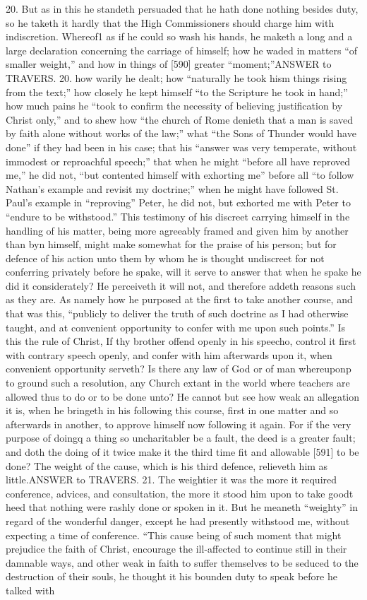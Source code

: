 20. But as in this he standeth persuaded that he hath done nothing besides duty, so he taketh it hardly that the High Commissioners should charge him with indiscretion. Whereof1 as if he could so wash his hands, he maketh a long and a large declaration concerning the carriage of himself; how he waded in matters “of smaller weight,” and how in things of [590] greater “moment;”ANSWER to TRAVERS. 20. how warily he dealt; how “naturally he took hism things rising from the text;” how closely he kept himself “to the Scripture he took in hand;” how much pains he “took to confirm the necessity of believing justification by Christ only,” and to shew how “the church of Rome denieth that a man is saved by faith alone without works of the law;” what “the Sons of Thunder would have done” if they had been in his case; that his “answer was very temperate, without immodest or reproachful speech;” that when he might “before all have reproved me,” he did not, “but contented himself with exhorting me” before all “to follow Nathan’s example and revisit my doctrine;” when he might have followed St. Paul’s example in “reproving” Peter, he did not, but exhorted me with Peter to “endure to be withstood.” This testimony of his discreet carrying himself in the handling of his matter, being more agreeably framed and given him by another than byn himself, might make somewhat for the praise of his person; but for defence of his action unto them by whom he is thought undiscreet for not conferring privately before he spake, will it serve to answer that when he spake he did it considerately? He perceiveth it will not, and therefore addeth reasons such as they are. As namely how he purposed at the first to take another course, and that was this, “publicly to deliver the truth of such doctrine as I had otherwise taught, and at convenient opportunity to confer with me upon such points.” Is this the rule of Christ, If thy brother offend openly in his speecho, control it first with contrary speech openly, and confer with him afterwards upon it, when convenient opportunity serveth? Is there any law of God or of man whereuponp to ground such a resolution, any Church extant in the world where teachers are allowed thus to do or to be done unto? He cannot but see how weak an allegation it is, when he bringeth in his following this course, first in one matter and so afterwards in another, to approve himself now following it again. For if the very purpose of doingq a thing so uncharitabler be a fault, the deed is a greater fault; and doth the doing of it twice make it the third time fit and allowable [591] to be done? The weight of the cause, which is his third defence, relieveth him as little.ANSWER to TRAVERS. 21. The weightier it was the more it required conference, advices, and consultation, the more it stood him upon to take goodt heed that nothing were rashly done or spoken in it. But he meaneth “weighty” in regard of the wonderful danger, except he had presently withstood me, without expecting a time of conference. “This cause being of such moment that might prejudice the faith of Christ, encourage the ill-affected to continue still in their damnable ways, and other weak in faith to suffer themselves to be seduced to the destruction of their souls, he thought it his bounden duty to speak before he talked with 